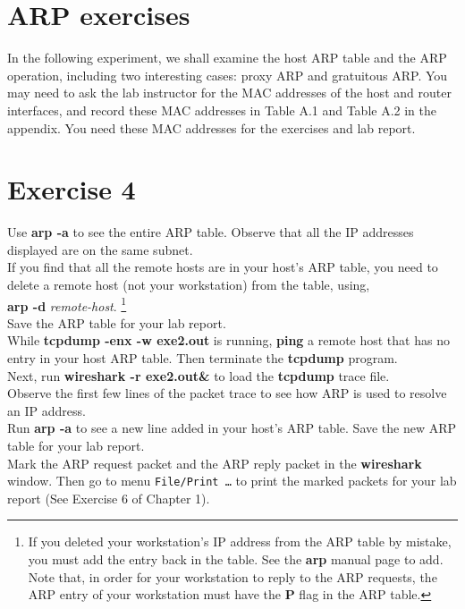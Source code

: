 \documentclass[10pt,a4paper]{article}
\numberwithin{equation}{section}
\numberwithin{figure}{section}
\numberwithin{table}{section}
\begin{document}
    \section*{ARP exercises}
    In the following experiment, we shall examine the host ARP table and the ARP operation, including two interesting cases: proxy ARP and gratuitous ARP. You may need to ask the lab instructor for the MAC addresses of the host and router interfaces, and record these MAC addresses in Table A.1 and Table A.2 in the appendix.
    You need these MAC addresses for the exercises and lab report.

    \section{ Exercise 4}
    Use \textbf{arp -a} to see the entire ARP table.
    Observe that all the IP addresses displayed are on the same subnet. \\
    If you find that all the remote hosts are in your host’s ARP table, you need to delete a remote host (not your workstation) from the table, using, \\
    \textbf{arp -d} \textit{remote-host}. \footnote{If you deleted your workstation’s IP address from the ARP table by mistake, you must add the entry back in the table. See the \textbf{arp} manual page to add.
    Note that, in order for your workstation to reply to the ARP requests, the ARP entry of your workstation must have the \textbf{P} flag in the ARP table.} \\
    Save the ARP table for your lab report. \\
    While \textbf{tcpdump -enx -w exe2.out} is running, \textbf{ping} a remote host that has no entry in your host ARP table.
    Then terminate the \textbf{tcpdump} program. \\
    Next, run \textbf{wireshark -r exe2.out\&} to load the \textbf{tcpdump} trace file. \\
    Observe the first few lines of the packet trace to see how ARP is used to resolve an IP address. \\
    Run \textbf{arp -a} to see a new line added in your host’s ARP table.
    Save the new ARP table for your lab report. \\
    Mark the ARP request packet and the ARP reply packet in the \textbf{wireshark} window.
    Then go to menu \texttt{File/Print \ldots} to print the marked packets for your lab report (See Exercise 6 of Chapter 1). \\
\end{document}
